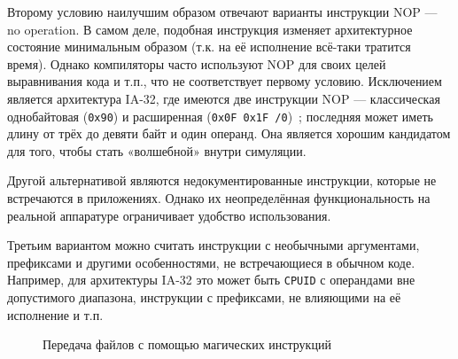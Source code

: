 Второму условию наилучшим образом отвечают варианты инструкции NOP --- no operation. В самом деле, подобная инструкция изменяет архитектурное состояние минимальным образом (т.к. на её исполнение всё-таки тратится время). Однако компиляторы часто используют NOP для своих целей выравнивания кода и т.п., что не соответствует первому условию. Исключением является архитектура IA-32, где имеются две инструкции NOP --- классическая однобайтовая (\texttt{0x90}) и  расширенная (\texttt{0x0F 0x1F /0})~\cite{intelmanual2a}; последняя может иметь длину от трёх до девяти байт и один операнд. Она является хорошим кандидатом для того, чтобы стать «волшебной» внутри симуляции.

Другой альтернативой являются недокументированные инструкции, которые не встречаются в приложениях. Однако их неопределённая функциональность на реальной аппаратуре ограничивает удобство использования.

Третьим вариантом можно считать инструкции с необычными аргументами, префиксами и другими особенностями, не встречающиеся в обычном коде. Например, для архитектуры IA-32 это может быть \texttt{CPUID} с операндами вне допустимого диапазона, инструкции с префиксами, не влияющими на её исполнение и т.п.

\begin{figure}[htp]
	\centering
	\caption{Передача файлов с помощью магических инструкций}
	\label{fig:magic-inst}
\end{figure}

